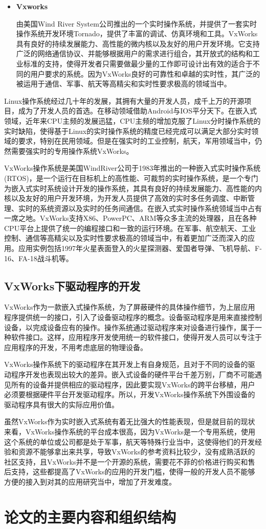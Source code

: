 \begin{itemize}
\item \textbf{Vxworks}

	由美国Wind River System公司推出的一个实时操作系统，并提供了一套实时操作系统开发环境Tornado，提供了丰富的调试、仿真环境和工具。VxWorks具有良好的持续发展能力、高性能的微内核以及友好的用户开发环境。它支持广泛的网络通信协议、并能够根据用户的需求进行组合，其开放式的结构和工业标准的支持，使得开发者只需要做最少量的工作即可设计出有效的适合于不同的用户要求的系统。因为VxWorks良好的可靠性和卓越的实时性，其广泛的被运用于通信、军事、航天等高精尖和实时性要求极高的领域当中。	
	 
\end{itemize}

	Linux操作系统经过几十年的发展，其拥有大量的开发人员，成千上万的开源项目，成为了开发人员的首选。在移动领域借助Android与IOS平分天下。在嵌入式领域，近年来CPU主频的发展迅猛，CPU主频的增加克服了Linux分时操作系统的实时缺陷，使得基于Linux的实时操作系统的精度已经完成可以满足大部分实时领域的要求，特别在民用领域。但是在强实时的工业控制，航天，军用领域当中，仍然需要强实时的专用操作系统VxWorks。 	
	
	VxWorks操作系统是美国WindRiver公司于1983年推出的一种嵌入式实时操作系统(RTOS)，是一个运行在目标机上的高性能、可裁剪的实时操作系统，是一个专门为嵌入式实时系统设计开发的操作系统，其具有良好的持续发展能力、高性能的内核以及友好的用户开发环境，为开发人员提供了高效的实时多任务调度、中断管理、实时的系统资源以及实时的任务间通信。在嵌入式实时操作系统领域当中占有一席之地。VxWorks支持X86、PowerPC、ARM等众多主流的处理器，且在各种CPU平台上提供了统一的编程接口和一致的运行环境。在军事、航空航天、工业控制、通信等高精尖以及实时性要求极高的领域当中，有着更加广泛而深入的应用。应用实例包括1997年火星表面登入的火星探测器、爱国者导弹、飞机导航、F-16、FA-18战斗机等。
	
\subsection{VxWorks下驱动程序的开发}
	
	VxWorks作为一款嵌入式操作系统，为了屏蔽硬件的具体操作细节，为上层应用程序提供统一的接口，引入了设备驱动程序的概念。设备驱动程序是用来直接控制设备，以完成设备应有的操作。操作系统通过驱动程序来对设备进行操作，属于一种软件接口。这样，应用程序开发使用统一的软件接口，使得开发人员可以专注于应用程序的开发，不用考虑底层的物理设备。
	
	VxWorks操作系统下的驱动程序在其开发上有自身规范，且对于不同的设备的驱动程序开发也表现出较大的差异。嵌入式设备的硬件平台千差万别，厂商不可能遇见所有的设备并提供相应的驱动程序，因此要实现VxWorks的跨平台移植，用户必须要根据硬件平台开发驱动程序。所以，开发VxWorks操作系统下外围设备的驱动程序具有很大的实际应用价值。
		
	虽然VxWorks作为实时嵌入式系统有着无比强大的性能表现，但是就目前的现状来看，VxWorks操作系统的平台成本很高，因为VxWorks是一个专用系统，使用这个系统的单位或公司都是处于军事，航天等特殊行业当中，这使得他们的开发经验和资源不能够拿出来共享，导致VxWorks的参考资料比较少，没有成熟活跃的社区支持，且VxWorks并不是一个开源的系统，需要花不菲的价格进行购买和售后支持，这些都提高了VxWorks的应用的开发门槛，使得一般的开发人员不能够方便的接入到对其的应用研究当中，增加了开发难度。

\section{论文的主要内容和组织结构}